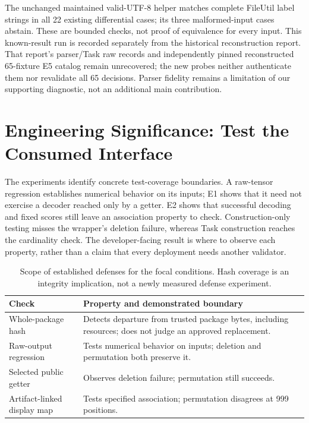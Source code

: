 \documentclass[10pt,conference]{IEEEtran}
\begin{document}
The unchanged maintained valid-UTF-8 helper matches complete FileUtil label strings in all 22 existing differential cases; its three malformed-input cases abstain. These are bounded checks, not proof of equivalence for every input. This known-result run is recorded separately from the historical reconstruction report. That report's parser/Task raw records and independently pinned reconstructed 65-fixture E5 catalog remain unrecovered; the new probes neither authenticate them nor revalidate all 65 decisions. Parser fidelity remains a limitation of our supporting diagnostic, not an additional main contribution.

\section{Engineering Significance: Test the Consumed Interface}
\label{sec:discussion}
The experiments identify concrete test-coverage boundaries. A raw-tensor regression establishes numerical behavior on its inputs; E1 shows that it need not exercise a decoder reached only by a getter. E2 shows that successful decoding and fixed scores still leave an association property to check. Construction-only testing misses the wrapper's deletion failure, whereas Task construction reaches the cardinality check. The developer-facing result is where to observe each property, rather than a claim that every deployment needs another validator.

\begin{table}[t]
\caption{Scope of established defenses for the focal conditions. Hash coverage is an integrity implication, not a newly measured defense experiment.}
\label{tab:coverage}
\centering\footnotesize
\begin{tabularx}{\columnwidth}{@{}p{}X@{}}
\toprule
Check & Property and demonstrated boundary\\
\midrule
Whole-package hash & Detects departure from trusted package bytes, including resources; does not judge an approved replacement.\\
Raw-output regression & Tests numerical behavior on inputs; deletion and permutation both preserve it.\\
Selected public getter & Observes deletion failure; permutation still succeeds.\\
Artifact-linked display map & Tests specified association; permutation disagrees at 999 positions.\\
\bottomrule
\end{tabularx}
\end{table}
\end{document}
